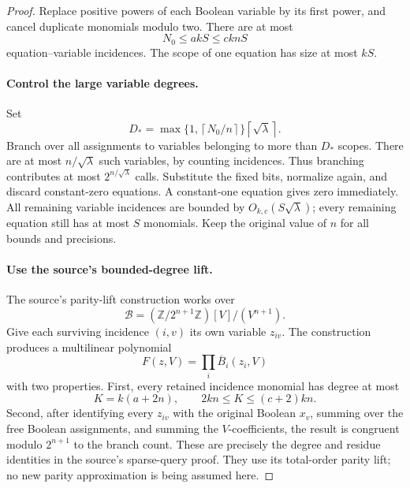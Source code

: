 \documentclass[11pt]{article}
\numberwithin{equation}{section}
\theoremstyle{definition}\newtheorem{definition}[theorem]{Definition}
\theoremstyle{remark}\newtheorem{remark}[theorem]{Remark}
\newcommand{\Z}{\mathbb Z}
\newcommand{\ceil}[1]{\left\lceil#1\right\rceil}
\begin{document}
\begin{proof}
Replace positive powers of each Boolean variable by its first power,
and cancel duplicate monomials modulo two. There are at most
\begin{equation}\label{eq:incidences}
 N_0\le akS\le cknS
\end{equation}
equation--variable incidences. The scope of one equation has size at
most $kS$.

\paragraph{Control the large variable degrees.}
Set
\[
 D_* = \max\{1,\ceil{N_0/n}\}\ceil{\sqrt\lambda}.
\]
Branch over all assignments to variables belonging to more than
$D_*$ scopes. There are at most $n/\sqrt\lambda$ such variables, by
counting incidences. Thus branching contributes at most
$2^{n/\sqrt\lambda}$ calls. Substitute the fixed bits, normalize
again, and discard constant-zero equations. A constant-one equation
gives zero immediately. All remaining variable incidences are bounded
by $O_{k,c}(S\sqrt\lambda)$; every remaining equation still has at
most $S$ monomials. Keep the original value of $n$ for all bounds and
precisions.

\paragraph{Use the source's bounded-degree lift.}
The source's parity-lift construction works over
\[
 \mathcal B=(\Z/2^{n+1}\Z)[V]/(V^{n+1}).
\]
Give each surviving incidence $(i,v)$ its own variable $z_{iv}$.
The construction produces a multilinear polynomial
\[
 F(z,V)=\prod_i \overline B_i(z_i,V)
\]
with two properties. First, every retained incidence monomial has
degree at most
\begin{equation}\label{eq:degree}
 K=k(a+2n),\qquad 2kn\le K\le(c+2)kn.
\end{equation}
Second, after identifying every $z_{iv}$ with the original Boolean
$x_v$, summing over the free Boolean assignments, and summing the
$V$-coefficients, the result is congruent modulo $2^{n+1}$ to the
branch count. These are precisely the degree and residue identities
in the source's sparse-query proof. They use its total-order parity
lift; no new parity approximation is being assumed here.


\end{proof}
\end{document}
